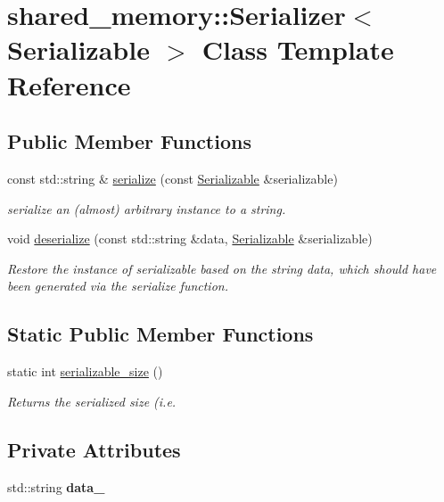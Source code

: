 \hypertarget{classshared__memory_1_1Serializer}{}\section{shared\+\_\+memory\+:\+:Serializer$<$ Serializable $>$ Class Template Reference}
\label{classshared__memory_1_1Serializer}
\subsection*{Public Member Functions}
\begin{DoxyCompactItemize}
\item 
const std\+::string \& \hyperlink{classshared__memory_1_1Serializer_a61ea01a0e5e28fc24c9274455050b1c1}{serialize} (const \hyperlink{classSerializable}{Serializable} \&serializable)
\begin{DoxyCompactList}\small\item\em serialize an (almost) arbitrary instance to a string. \end{DoxyCompactList}\item 
void \hyperlink{classshared__memory_1_1Serializer_a8f674c9b3a7c053403112d2fad4e09a9}{deserialize} (const std\+::string \&data, \hyperlink{classSerializable}{Serializable} \&serializable)
\begin{DoxyCompactList}\small\item\em Restore the instance of serializable based on the string data, which should have been generated via the serialize function. \end{DoxyCompactList}\end{DoxyCompactItemize}
\subsection*{Static Public Member Functions}
\begin{DoxyCompactItemize}
\item 
static int \hyperlink{classshared__memory_1_1Serializer_af5edd0af254d6061e8e18c0bbec10aa9}{serializable\+\_\+size} ()
\begin{DoxyCompactList}\small\item\em Returns the serialized size (i.\+e. \end{DoxyCompactList}\end{DoxyCompactItemize}
\subsection*{Private Attributes}
\begin{DoxyCompactItemize}
\item 
std\+::string {\bfseries data\+\_\+}\hypertarget{classshared__memory_1_1Serializer_ad1fb7ce2b9dfde8e609aa770a3f97e72}{}\label{classshared__memory_1_1Serializer_ad1fb7ce2b9dfde8e609aa770a3f97e72}

\end{DoxyCompactItemize}


